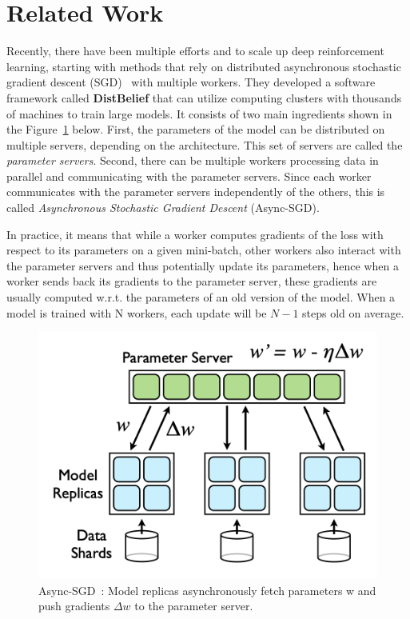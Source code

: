 
\section{Related Work}\label{related_work}

Recently, there have been multiple efforts and to scale up deep reinforcement learning, starting with methods that rely on distributed asynchronous stochastic gradient descent (SGD)~\parencite{dean2012large} with multiple workers. They developed a software framework called \textbf{DistBelief} that can utilize computing clusters with thousands of machines to train large models. It consists of two main ingredients shown in the Figure~\ref{fig:sgd} below. First, the parameters of the model can be distributed on multiple servers, depending on the architecture. This set of servers are called the \textit{parameter servers}. Second, there can be multiple workers processing data in parallel and communicating with the parameter servers. Since each worker communicates with the parameter servers independently of the others, this is called \textit{Asynchronous Stochastic Gradient Descent} (Async-SGD).

In practice, it means that while a worker computes gradients of the loss with respect to its parameters on a given mini-batch, other workers also interact with the parameter servers and thus potentially update its parameters, hence when a worker sends back its gradients to the parameter server, these gradients are usually computed w.r.t. the parameters of an old version of the model. When a model is trained with N workers, each update will be $N-1$ steps old on average.

\begin{figure}[!htb]
	\centering
	\includegraphics[width=0.5\linewidth]{figures/algos/sgd.png}
	\caption{Async-SGD~\parencite{dean2012large}: Model replicas asynchronously fetch parameters w and push gradients \(\Delta w\) to the parameter server.}
	\label{fig:sgd}
\end{figure}


